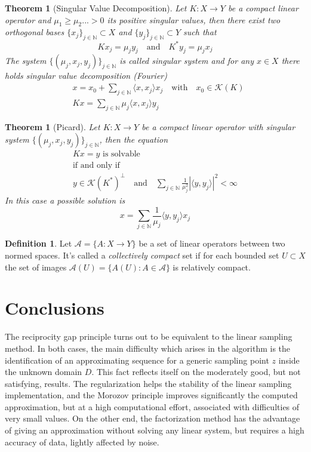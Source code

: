 \documentclass[10pt, a4paper, twoside, openright]{book}
\theoremstyle{definition}
\newtheorem{definition}[subsection]{Definition}
\theoremstyle{plain}
\newtheorem{theorem}[subsection]{Theorem}
\theoremstyle{plain}
\theoremstyle{plain}
\theoremstyle{plain}
\theoremstyle{plain}
\theoremstyle{plain}
\theoremstyle{plain}
\theoremstyle{plain}
\begin{document}
\begin{theorem}[Singular Value Decomposition]
Let $K: X\to Y$ be a compact linear operator and $\mu_1\geq\mu_2...>0$ its positive singular values, then there exist two orthogonal bases $\{x_j\}_{j \in \mathbb{N}}\subset X$ and $\{y_j\}_{j \in \mathbb{N}}\subset Y$ such that
\begin{equation}
 Kx_j = \mu_j y_j \quad \text{and}\quad K^* y_j = \mu_j x_j
\end{equation}
The system $\{(\mu_j,x_j,y_j)\}_{j \in \mathbb{N}}$ is called singular system and for any $x \in X$ there holds singular value decomposition (Fourier)
\begin{align}
 & x = x_0 + \sum_{j \in \mathbb{N}} \langle x, x_j \rangle x_j\quad \text{with}\quad x_0 \in \mathcal{K}(K) \\
 & Kx = \sum_{j \in \mathbb{N}} \mu_j \langle x, x_j \rangle y_j
\end{align}
\end{theorem}

\begin{theorem}[Picard]
Let $K: X \to Y$ be a compact linear operator with singular system $\{(\mu_j,x_j,y_j)\}_{j \in \mathbb{N}}$, then the equation
\begin{gather}
 Kx = y \,\,\text{is solvable}\\
 \text{if and only if}\\
 y \in \mathcal{K}(K^*)^\perp\quad\text{and} \quad \sum_{j \in \mathbb{N}}\frac{1}{\mu_j^2}|\langle y,y_j\rangle|^2< \infty
\end{gather}
In this case a possible solution is
\begin{equation}
 x = \sum_{j \in \mathbb{N}}\frac{1}{\mu_j}\langle y,y_j\rangle x_j
\end{equation}
\end{theorem}
\begin{definition}
\label{def:collectively-compact}
 Let $\mathcal{A}=\{A:X\to Y\}$ be a set of linear operators between two normed spaces. It's called a \emph{collectively compact} set if for each bounded set $U\subset X$ the set of images $\mathcal{A}(U)=\{A(U):A\in\mathcal{A}\}$ is relatively compact.
\end{definition}
\chapter*{Conclusions}
The reciprocity gap principle turns out to be equivalent to the linear sampling method.
In both cases, the main difficulty which arises in the algorithm is the identification of an approximating
sequence for a generic sampling point $z$ inside the unknown domain $D$. This fact reflects itself 
on the moderately good, but not satisfying, results.
The regularization helps the stability of the linear sampling implementation, and 
the Morozov principle improves significantly the computed approximation, but at a high 
computational effort, associated with difficulties of very small values.
On the other end, the factorization method has the advantage of giving an approximation 
without solving any linear system, but requires a high accuracy of data, lightly affected 
by noise.
\end{document}
